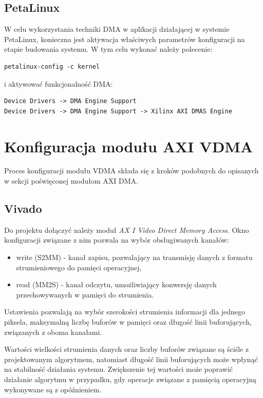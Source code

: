 \subsection{PetaLinux}
\label{sec:vivado-axi-dma-petalinux}
W celu wykorzystania techniki DMA w aplikacji działającej w systemie PetaLinux, konieczna jest aktywacja właściwych parametrów konfiguracji na etapie budowania systemu. W tym celu wykonać należy polecenie:

\begin{lstlisting}[breaklines]
petalinux-config -c kernel
\end{lstlisting}

i aktywować funkcjonalność DMA:

\begin{lstlisting}[breaklines]
Device Drivers -> DMA Engine Support
Device Drivers -> DMA Engine Support -> Xilinx AXI DMAS Engine
\end{lstlisting}

\section{Konfiguracja modułu AXI VDMA}
\label{sec:vivado-axi-vdma}
Proces konfiguracji modułu VDMA składa się z kroków podobnych do opisanych w sekcji poświęconej modułom AXI DMA.

\subsection{Vivado}
Do projektu dołączyć należy moduł \textit{AX I Video Direct Memory Access}. Okno konfiguracji związane z nim pozwala na wybór obsługiwanych kanałów:
\begin{itemize}
	\item write (S2MM) - kanał zapisu, pozwalający na transmisję danych z formatu strumieniowego do pamięci operacyjnej,
	\item read (MM2S) - kanał odczytu, umożliwiający konwersję danych przechowywanych w pamięci do strumienia.
\end{itemize}

Ustawienia pozwalają na wybór szerokości strumienia informacji dla jednego piksela, maksymalną liczbę buforów w pamięci oraz długość linii buforujących, związanych z oboma kanałami.

Wartości wielkości strumienia danych oraz liczby buforów związane są ściśle z projektowanym algorytmem, natomiast długość linii buforujących może wpłynąć na stabilność działania systemu. Zwiększenie tej wartości może poprawić działanie algorytmu w przypadku, gdy operacje związane z pamięcią operacyjną wykonywane są z opóźnieniem.

